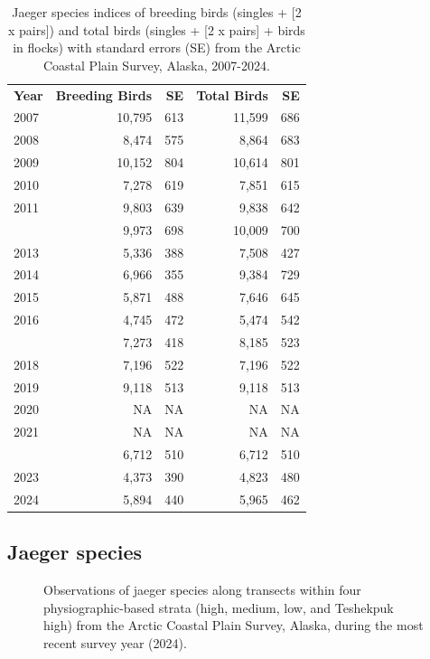 \documentclass[
]{article}
\begin{document}
\begin{longtable}[t]{lrrrr}

\caption{\label{tbl-JAEG}Jaeger species indices of breeding birds
(singles + {[}2 x pairs{]}) and total birds (singles + {[}2 x pairs{]} +
birds in flocks) with standard errors (SE) from the Arctic Coastal Plain
Survey, Alaska, 2007-2024.}

\tabularnewline

\\
\toprule
\textbf{Year} & \textbf{Breeding Birds} & \textbf{SE} & \textbf{Total Birds} & \textbf{SE}\\
\midrule
2007 & 10,795 & 613 & 11,599 & 686\\
2008 & 8,474 & 575 & 8,864 & 683\\
2009 & 10,152 & 804 & 10,614 & 801\\
2010 & 7,278 & 619 & 7,851 & 615\\
2011 & 9,803 & 639 & 9,838 & 642\\
\addlinespace
2012 & 9,973 & 698 & 10,009 & 700\\
2013 & 5,336 & 388 & 7,508 & 427\\
2014 & 6,966 & 355 & 9,384 & 729\\
2015 & 5,871 & 488 & 7,646 & 645\\
2016 & 4,745 & 472 & 5,474 & 542\\
\addlinespace
2017 & 7,273 & 418 & 8,185 & 523\\
2018 & 7,196 & 522 & 7,196 & 522\\
2019 & 9,118 & 513 & 9,118 & 513\\
2020 & NA & NA & NA & NA\\
2021 & NA & NA & NA & NA\\
\addlinespace
2022 & 6,712 & 510 & 6,712 & 510\\
2023 & 4,373 & 390 & 4,823 & 480\\
2024 & 5,894 & 440 & 5,965 & 462\\
\bottomrule

\end{longtable}

\endgroup{}

\newpage{}

\subsection*{Jaeger species}\label{jaeger-species-2}

\begin{figure}


\caption{\label{fig-JAEGmap}Observations of jaeger species along
transects within four physiographic-based strata (high, medium, low, and
Teshekpuk high) from the Arctic Coastal Plain Survey, Alaska, during the
most recent survey year (2024).}

\end{figure}%
\end{document}
